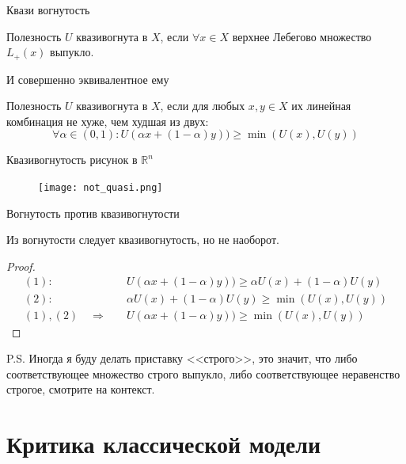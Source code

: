 \documentclass{beamer}
\begin{document}
\begin{frame}{Квази вогнутость}

\begin{definition}
Полезность $U$ \alert{квазивогнута} в $X$, если $\forall x \in X$ верхнее Лебегово множество $L_{+}(x)$ выпукло. 
\end{definition}

И совершенно эквивалентное ему

\begin{definition}
Полезность $U$ \alert{квазивогнута} в $X$, если для любых $x, y \in X$ их линейная комбинация не хуже, чем худшая из двух:
$$ \forall \alpha \in (0,1): U(\alpha x + (1-\alpha) y)) \geqslant \min(U(x), U(y))$$

\end{definition}

\end{frame}

\begin{frame}{Квазивогнутость}
рисунок в $\mathbb{R}^n$
\begin{figure}[hbt]
\centering
\texttt{[image: not\_quasi.png]}
\end{figure}

\end{frame}

\begin{frame}{Вогнутость против квазивогнутости}

\begin{lemma}
Из вогнутости следует квазивогнутость, но не наоборот.
\end{lemma}

\begin{proof}
\begin{align*} 
(1) : & \quad U(\alpha x + (1-\alpha) y)) \geqslant \alpha U(x) + (1-\alpha) U(y) \\
(2) : & \quad \alpha U(x) + (1-\alpha) U(y) \geqslant \min (U(x), U(y))\\
(1), (2) \quad \Rightarrow & \quad U(\alpha x + (1-\alpha) y)) \geqslant \min (U(x), U(y))
\end{align*}
\end{proof}

P.S. Иногда я буду делать приставку <<\alert{строго}>>, это значит, что либо соответствующее множество строго выпукло, либо соответствующее неравенство строгое, смотрите на контекст.

\end{frame}

\section{Критика классической модели}
\end{document}
